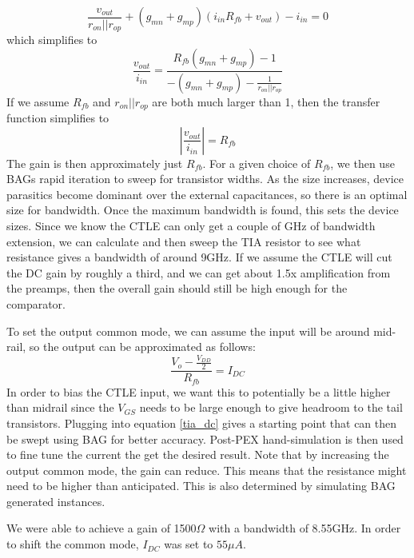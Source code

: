 \begin{equation}
\label{TIA gain KCL}
\frac{v_{out}}{r_{on}||r_{op}}+(g_{mn}+g_{mp})(i_{in}R_{fb}+v_{out})-i_{in}=0
\end{equation}
which simplifies to
\begin{equation}
\label{TIA gain full}
\frac{v_{out}}{i_{in}}=\frac{R_{fb}(g_{mn}+g_{mp})-1}{-(g_{mn}+g_{mp})-\frac{1}{r_{on}||r_{op}}}
\end{equation}
If we assume $R_{fb}$ and $r_{on}||r_{op}$ are both much larger than 1, then the transfer function simplifies to
\begin{equation}
\label{TIA gain}
|\frac{v_{out}}{i_{in}}|=R_{fb}
\end{equation}
The gain is then approximately just $R_{fb}$. For a given choice of $R_{fb}$, we then use BAGs rapid iteration to sweep for transistor widths. As the size increases, device parasitics become dominant over the external capacitances, so there is an optimal size for bandwidth. Once the maximum bandwidth is found, this sets the device sizes. Since we know the CTLE can only get a couple of GHz of bandwidth extension, we can calculate and then sweep the TIA resistor to see what resistance gives a bandwidth of around 9GHz. If we assume the CTLE will cut the DC gain by roughly a third, and we can get about 1.5x amplification from the preamps, then the overall gain should still be high enough for the comparator.

To set the output common mode, we can assume the input will be around mid-rail, so the output can be approximated as follows:
\begin{equation}
\label{tia_dc}
\frac{V_{o}-\frac{V_{DD}}{2}}{R_{fb}}=I_{DC}
\end{equation}
In order to bias the CTLE input, we want this to potentially be a little higher than midrail since the $V_{GS}$ needs to be large enough to give headroom to the tail transistors. Plugging into equation \ref{tia_dc} gives a starting point that can then be swept using BAG for better accuracy. Post-PEX hand-simulation is then used to fine tune the current the get the desired result. Note that by increasing the output common mode, the gain can reduce. This means that the resistance might need to be higher than anticipated. This is also determined by simulating BAG generated instances.

We were able to achieve a gain of 1500$\Omega$ with a bandwidth of 8.55GHz. In order to shift the common mode, $I_{DC}$ was set to $55\mu A$.


